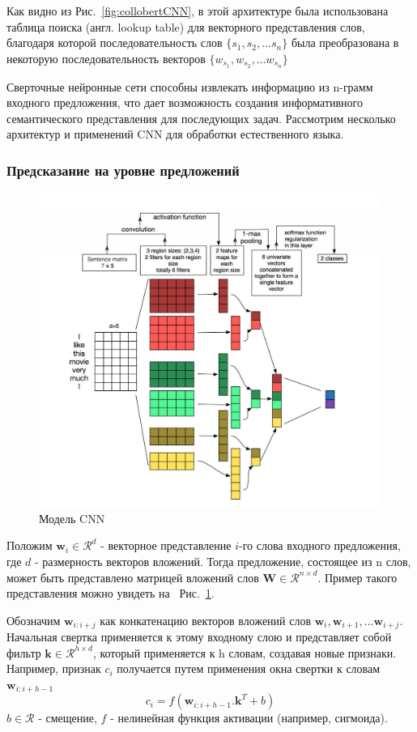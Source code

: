 Как видно из Рис.~\ref{fig:collobertCNN}, в этой архитектуре была использована таблица поиска (англ. lookup table) для векторного представления слов, благодаря которой последовательность слов $\{s_1, s_2, ... s_n\}$ была преобразована в некоторую последовательность векторов $\{ {{w}_{s_1}}, {{w}_{s_2}}, ... {{w}_{s_n}} \}$

Сверточные нейронные сети способны извлекать информацию из n-грамм входного предложения, что дает возможность создания информативного семантического представления для последующих задач. Рассмотрим несколько архитектур и применений CNN для обработки естественного языка.

\subsubsection{Предсказание на уровне предложений}
\begin{figure}[t]
	\includegraphics[scale=0.45]{img/CNN}
	\centering
	\caption{Модель CNN}\label{fig:CNN}
\end{figure}
Положим ${\mathbf w_{i}} \in \mathcal{R}^d$ - векторное представление $i$-го слова входного предложения, где $d$ - размерность векторов вложений. Тогда предложение, состоящее из n слов, может быть представлено матрицей вложений слов ${\mathbf W} \in \mathcal{R}^{n \times d}$. Пример такого представления можно увидеть на ~Рис.~\ref{fig:CNN}.

Обозначим ${\mathbf w_{i:i+j}} $ как конкатенацию векторов
 вложений слов ${\mathbf w_{i}}, {\mathbf w_{i+1}}, ... {\mathbf w_{i+j}}$. Начальная свертка применяется к этому входному слою и представляет собой фильтр ${\mathbf k} \in \mathcal{R}^{h \times d}$, который применяется к h словам, создавая новые признаки. Например, признак $c_i$ получается путем применения окна свертки к словам ${\mathbf w_{i:i+h-1}} $
\begin{equation}
c_i = f({\mathbf w_{i:i+h-1}}.{\mathbf k}^T + b )
\end{equation} 
 $b \in \mathcal{R}$ - смещение, $f$ - нелинейная функция активации (например, сигмоида). 
 
